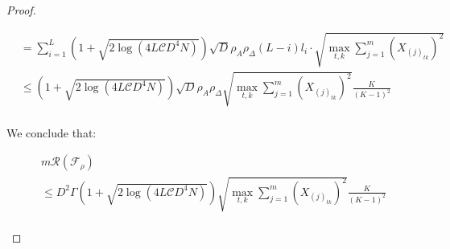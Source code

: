 \begin{proof}
\begin{small}
\begin{equation*}
\begin{aligned}
&= \sum_{i=1}^L (1 + \sqrt{2\log (4L \mathcal{C} D^4 N)}) \sqrt{D} \rho^{}_A \rho^{}_{\Delta} (L-i) l_i \cdot \sqrt{ \max_{t, k}\sum_{j=1}^m (X_{(j)_{tk}})^2}\\
&\leq (1 + \sqrt{2\log (4L \mathcal{C} D^4 N)}) \sqrt{D} \rho^{}_A \rho^{}_{\Delta}\sqrt{\max_{t, k} \sum_{j=1}^m (X_{(j)_{tk}})^2} \frac{K}{(K-1)^2}\\
\end{aligned}
\end{equation*}
\end{small}
We conclude that:
\begin{small}
\begin{equation*}
\begin{aligned}
&m\mathcal{R(\mathcal{F}_{\rho})} \\ &\leq 
 D^{2} \Gamma (1 + \sqrt{2\log (4L \mathcal{C} D^4 N)}) \sqrt{\max_{t, k} \sum_{j=1}^m (X_{(j)_{tk}})^2} \frac{K}{(K-1)^2}\\
\end{aligned}
\end{equation*}
\end{small}
\end{proof}
\setcounter{theorem}{4}
